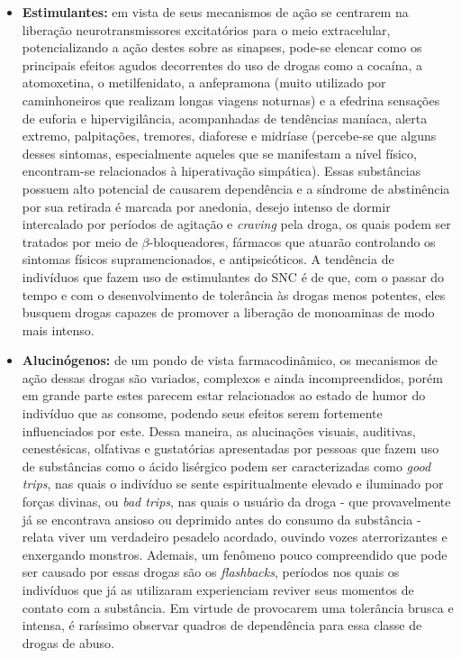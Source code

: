 \documentclass[
]{book}
\begin{document}
\begin{itemize}
\item
  \textbf{Estimulantes:} em vista de seus mecanismos de ação se centrarem na liberação neurotransmissores excitatórios para o meio extracelular, potencializando a ação destes sobre as sinapses, pode-se elencar como os principais efeitos agudos decorrentes do uso de drogas como a cocaína, a atomoxetina, o metilfenidato, a anfepramona (muito utilizado por caminhoneiros que realizam longas viagens noturnas) e a efedrina sensações de euforia e hipervigilância, acompanhadas de tendências maníaca, alerta extremo, palpitações, tremores, diaforese e midríase (percebe-se que alguns desses sintomas, especialmente aqueles que se manifestam a nível físico, encontram-se relacionados à hiperativação simpática). Essas substâncias possuem alto potencial de causarem dependência e a síndrome de abstinência por sua retirada é marcada por anedonia, desejo intenso de dormir intercalado por períodos de agitação e \emph{craving} pela droga, os quais podem ser tratados por meio de \(\beta\)-bloqueadores, fármacos que atuarão controlando os sintomas físicos supramencionados, e antipsicóticos. A tendência de indivíduos que fazem uso de estimulantes do SNC é de que, com o passar do tempo e com o desenvolvimento de tolerância às drogas menos potentes, eles busquem drogas capazes de promover a liberação de monoaminas de modo mais intenso.
\item
  \textbf{Alucinógenos:} de um pondo de vista farmacodinâmico, os mecanismos de ação dessas drogas são variados, complexos e ainda incompreendidos, porém em grande parte estes parecem estar relacionados ao estado de humor do indivíduo que as consome, podendo seus efeitos serem fortemente influenciados por este. Dessa maneira, as alucinações visuais, auditivas, cenestésicas, olfativas e gustatórias apresentadas por pessoas que fazem uso de substâncias como o ácido lisérgico podem ser caracterizadas como \emph{good trips}, nas quais o indivíduo se sente espiritualmente elevado e iluminado por forças divinas, ou \emph{bad trips}, nas quais o usuário da droga - que provavelmente já se encontrava ansioso ou deprimido antes do consumo da substância - relata viver um verdadeiro pesadelo acordado, ouvindo vozes aterrorizantes e enxergando monstros. Ademais, um fenômeno pouco compreendido que pode ser causado por essas drogas são os \emph{flashbacks}, períodos nos quais os indivíduos que já as utilizaram experienciam reviver seus momentos de contato com a substância. Em virtude de provocarem uma tolerância brusca e intensa, é raríssimo observar quadros de dependência para essa classe de drogas de abuso.
\end{itemize}
\end{document}
